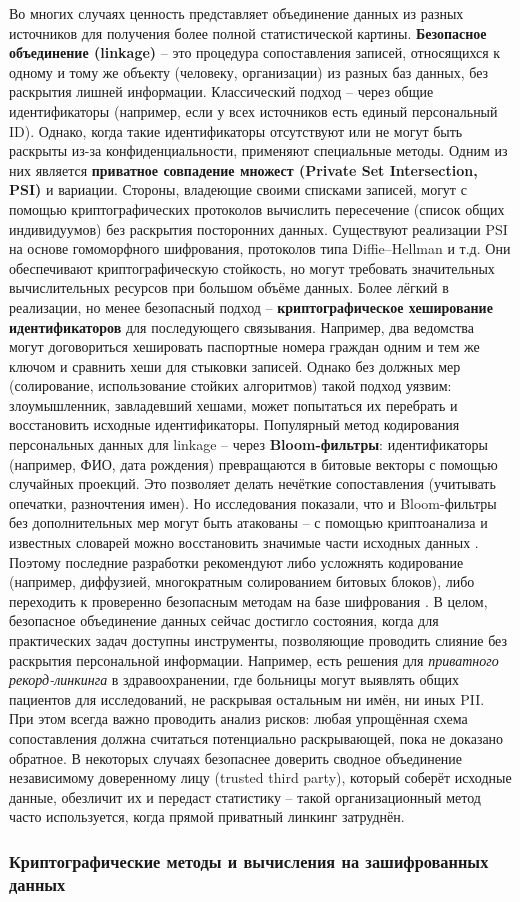 Во многих случаях ценность представляет объединение данных из разных источников для получения более полной статистической картины. \textbf{Безопасное объединение (linkage)} – это процедура сопоставления записей, относящихся к одному и тому же объекту (человеку, организации) из разных баз данных, без раскрытия лишней информации. Классический подход – через общие идентификаторы (например, если у всех источников есть единый персональный ID). Однако, когда такие идентификаторы отсутствуют или не могут быть раскрыты из-за конфиденциальности, применяют специальные методы. Одним из них является \textbf{приватное совпадение множест (Private Set Intersection, PSI)} и вариации. Стороны, владеющие своими списками записей, могут с помощью криптографических протоколов вычислить пересечение (список общих индивидуумов) без раскрытия посторонних данных. Существуют реализации PSI на основе гомоморфного шифрования, протоколов типа Diffie–Hellman и т.д. Они обеспечивают криптографическую стойкость, но могут требовать значительных вычислительных ресурсов при большом объёме данных. Более лёгкий в реализации, но менее безопасный подход – \textbf{криптографическое хеширование идентификаторов} для последующего связывания. Например, два ведомства могут договориться хешировать паспортные номера граждан одним и тем же ключом и сравнить хеши для стыковки записей. Однако без должных мер (солирование, использование стойких алгоритмов) такой подход уязвим: злоумышленник, завладевший хешами, может попытаться их перебрать и восстановить исходные идентификаторы. Популярный метод кодирования персональных данных для linkage – через \textbf{Bloom-фильтры}: идентификаторы (например, ФИО, дата рождения) превращаются в битовые векторы с помощью случайных проекций. Это позволяет делать нечёткие сопоставления (учитывать опечатки, разночтения имен). Но исследования показали, что и Bloom-фильтры без дополнительных мер могут быть атакованы – с помощью криптоанализа и известных словарей можно восстановить значимые части исходных данных
\autocite{journalprivacyconfidentiality-org}
. Поэтому последние разработки рекомендуют либо усложнять кодирование (например, диффузией, многократным солированием битовых блоков), либо переходить к проверенно безопасным методам на базе шифрования
\autocite{newton-ac-uk}
. В целом, безопасное объединение данных сейчас достигло состояния, когда для практических задач доступны инструменты, позволяющие проводить слияние без раскрытия персональной информации. Например, есть решения для \textit{приватного рекорд-линкинга} в здравоохранении, где больницы могут выявлять общих пациентов для исследований, не раскрывая остальным ни имён, ни иных PII. При этом всегда важно проводить анализ рисков: любая упрощённая схема сопоставления должна считаться потенциально раскрывающей, пока не доказано обратное. В некоторых случаях безопаснее доверить сводное объединение независимому доверенному лицу (trusted third party), который соберёт исходные данные, обезличит их и передаст статистику – такой организационный метод часто используется, когда прямой приватный линкинг затруднён. \subsubsection{Криптографические методы и вычисления на зашифрованных данных}
